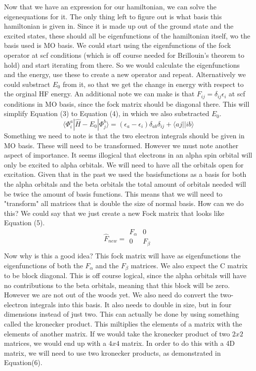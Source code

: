 \documentclass{article}
\begin{document}
Now that we have an expression for our hamiltonian, we can solve the eigenequations for it. The only thing left to figure out is what basis this hamiltonian is given in. Since it is made up out of the ground state and the excited states, these should all be eigenfunctions of the hamiltonian itself, wo the basis used is MO basis. We could start using the eigenfunctions of the fock operator at scf conditions (which is off course needed for Brillouin's theorem to hold) and start iterating from there. So we would calculate the eigenfunctions and the energy, use these to create a new operator and repeat. Alternatively we could substract $E_0$ from it, so that we get the change in energy with respect to the orginal HF energy. An additional note we can make is that $F_{ij} = \delta_{ij}\epsilon_i$ at scf conditions in MO basis, since the fock matrix should be diagonal there. This will simplify Equation (3) to Equation (4), in which we also substracted $E_0$.
\begin{equation}
\langle \Phi_i^a |\hat{H} - E_0| \Phi_j^b \rangle =  (\epsilon_a - \epsilon_i)\delta_{ab}\delta_{ij} + \langle aj|| ib \rangle
\end{equation}
Something we need to note is that the two electron integrals should be given in MO basis. These will need to be transformed. However we must note another aspect of importance. It seems illogical that electrons in an alpha spin orbital will only be excited to alpha orbitals. We will need to have all the orbitals open for excitation. Given that in the past we used the basisfunctions as a basis for both the alpha orbitals and the beta orbitals the total amount of orbitals needed will be twice the amount of basis functions. This means that we will need to "transform" all matrices that is double the size of normal basis. How can we do this? We could say that we just create a new Fock matrix that looks like Equation (5).
\begin{equation}
\hat{F}_{new} = \begin{matrix} F_{\alpha} & 0 \\
0 & F_{\beta} \\
\end{matrix}
\end{equation}
Now why is this a good idea? This fock matrix will have as eigenfunctions the eigenfunctions of both the $F_{\alpha}$ and the $F_{\beta}$ matrices. We also expect the C matrix to be block diagonal. This is off course logical, since the alpha orbitals will have no contributions to the beta orbitals, meaning that this block will be zero. However we are not out of the woods yet. We also need do convert the two-electron integrals into this basis. It also needs to double in size, but in four dimensions instead of just two. This can actually be done by using something called the kronecker product. This miltiplies the elements of a matrix with the elements of another matrix. If we would take the kronecker product of two $2x2$ matrices, we would end up with a $4x4$ matrix. In order to do this with a 4D matrix, we will need to use two kronecker products, as demonstrated in Equation(6).
\end{document}
